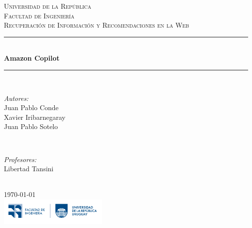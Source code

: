 \documentclass[12pt]{article}
\begin{document}
\begin{titlepage}

    \center

    \textsc{\LARGE Universidad de la República}\\[1.5cm]
    \textsc{\Large Facultad de Ingeniería}\\[1.0cm]
    \textsc{\large Recuperación de Información y Recomendaciones en la Web}\\[0.5cm]

    \rule{\linewidth}{0.5mm} \\[1cm]
    {\huge \bfseries Amazon Copilot}\\[0.5cm]
    \rule{\linewidth}{0.5mm} \\[1.5cm]

    \begin{minipage}{0.4\textwidth}
        \begin{flushleft} \large
            \emph{Autores:}\\
            Juan Pablo Conde\\
            Xavier Iribarnegaray\\
            Juan Pablo Sotelo\\
        \end{flushleft}
    \end{minipage}
    ~
    \begin{minipage}{0.4\textwidth}
        \begin{flushright} \large
            \emph{Profesores:} \\
            Libertad Tansini \\
        \end{flushright}
    \end{minipage}\\[2cm]

    {\large \today}\\[1.5cm]

    \includegraphics[width=0.4\textwidth]{fing-logo}\\[1cm]

    \vfill

\end{titlepage}



\tableofcontents

\newpage
\end{document}
